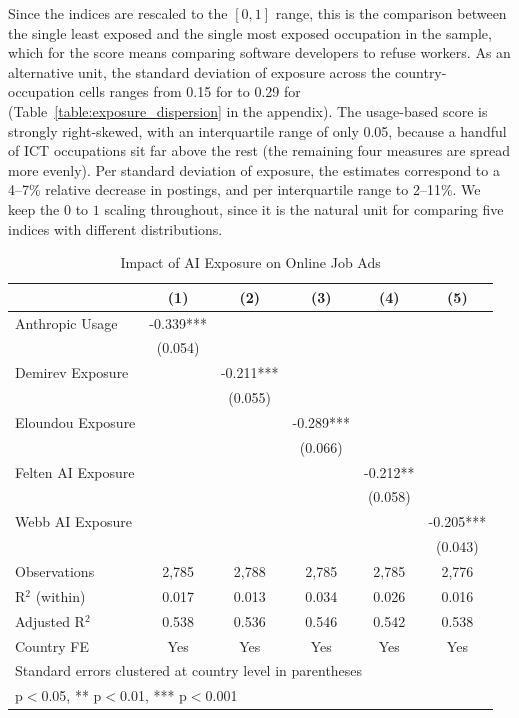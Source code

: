 \documentclass[11pt]{article}
\begin{document}
Since the indices are rescaled to the $[0,1]$ range, this is the comparison between the single least exposed and the single most exposed occupation in the sample, which for the \citet{handa2025economic} score means comparing software developers to refuse workers. As an alternative unit, the standard deviation of exposure across the country-occupation cells ranges from 0.15 for \citet{handa2025economic} to 0.29 for \citet{felten_method_2018} (Table~\ref{table:exposure_dispersion} in the appendix). The usage-based score is strongly right-skewed, with an interquartile range of only 0.05, because a handful of ICT occupations sit far above the rest (the remaining four measures are spread more evenly). Per standard deviation of exposure, the estimates correspond to a 4--7\% relative decrease in postings, and per interquartile range to 2--11\%. We keep the $0$ to $1$ scaling throughout, since it is the natural unit for comparing five indices with different distributions.

\begin{table}[htbp]
\centering
\caption{Impact of AI Exposure on Online Job Ads}
\begin{tabular}{lccccc}
\hline\hline
 & (1) & (2) & (3) & (4) & (5) \\
\midrule
Anthropic Usage & -0.339*** & & & & \\
 & (0.054) & & & & \\
Demirev Exposure & & -0.211*** & & & \\
 & & (0.055) & & & \\
Eloundou Exposure & & & -0.289*** & & \\
 & & & (0.066) & & \\
Felten AI Exposure & & & & -0.212** & \\
 & & & & (0.058) & \\
Webb AI Exposure & & & & & -0.205*** \\
 & & & & & (0.043) \\
\midrule
Observations & 2,785 & 2,788 & 2,785 & 2,785 & 2,776 \\
R$^2$ (within) & 0.017 & 0.013 & 0.034 & 0.026 & 0.016 \\
Adjusted R$^2$ & 0.538 & 0.536 & 0.546 & 0.542 & 0.538 \\
Country FE & Yes & Yes & Yes & Yes & Yes \\
\hline\hline
\multicolumn{6}{l}{\footnotesize Standard errors clustered at country level in parentheses} \\
\multicolumn{6}{l}{\footnotesize * p$<$0.05, ** p$<$0.01, *** p$<$0.001} \\
\end{tabular}
\label{table:delta_models}
\end{table}
\end{document}

